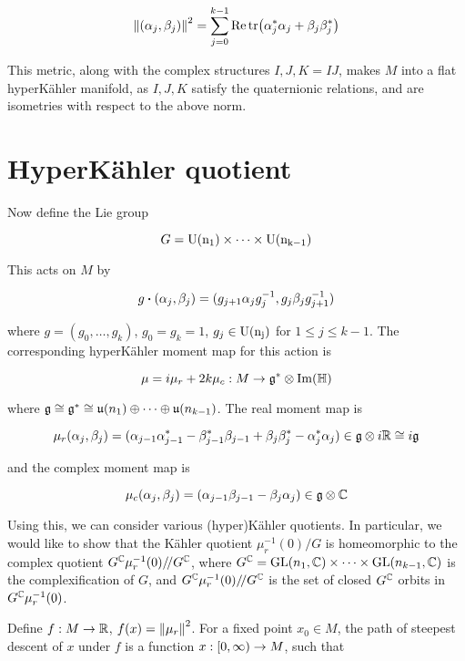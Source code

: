 \documentclass{report}
\newcommand{\sslash}{/\!/}
\begin{document}
\[\norm{(\alpha_j, \beta_j)}^2 = \sum_{j=0}^{k-1}\Re\tr(\alpha_j^*\alpha_j + \beta_j\beta_j^*)\]

This metric, along with the complex structures \(I, J, K = IJ\), makes \(M\) into a flat hyperK\"ahler manifold, as \(I, J, K\) satisfy the quaternionic relations, and are isometries with respect to the above norm.

\section{HyperK\"ahler quotient}

\label{sec:hyperkahler-quotient}

Now define the Lie group

\[G = \rm U(n_1) \times \cdots \times \rm U(n_{k-1})\]

This acts on \(M\) by

\begin{equation}
    \label{eq:ks-action}
    g \vdot (\alpha_j, \beta_j) = (g_{j+1}\alpha_jg_j^{-1}, g_j\beta_jg_{j+1}^{-1})
\end{equation}

where \(g = (g_0, \dots, g_k)\), \(g_0 = g_k = 1\), \(g_j \in \rm U(n_j)\) for \(1 \le j \le k-1\). The corresponding hyperK\"ahler moment map for this action is

\[\mu = i\mu_r + 2k\mu_c : M \to \mathfrak{g}^* \otimes \Im(\mathbb{H})\]

where \(\mathfrak{g} \cong \mathfrak{g}^* \cong \mathfrak{u}(n_1) \oplus \cdots \oplus \mathfrak{u}(n_{k-1})\). The real moment map is

\[\mu_r(\alpha_j, \beta_j) = (\alpha_{j-1}\alpha_{j-1}^* - \beta_{j-1}^*\beta_{j-1} + \beta_j\beta_j^* - \alpha_j^*\alpha_j) \in \mathfrak{g} \otimes i\mathbb{R} \cong i\mathfrak{g}\]

and the complex moment map is

\[\mu_c(\alpha_j, \beta_j) = (\alpha_{j-1}\beta_{j-1} - \beta_j\alpha_j) \in \mathfrak{g} \otimes \mathbb{C}\]

Using this, we can consider various (hyper)K\"ahler quotients. In particular, we would like to show that the K\"ahler quotient \(\mu_r^{-1}(0)/G\) is homeomorphic to the complex quotient \(G^\C\mu_r^{-1}(0)\sslash G^\C\), where \(G^{\mathbb{C}} = \operatorname{GL}(n_1, \mathbb{C}) \times \cdots \times \operatorname{GL}(n_{k-1}, \mathbb{C})\) is the complexification of \(G\), and \(G^\C\mu_r^{-1}(0)\sslash G^\C\) is the set of closed \(G^{\mathbb{C}}\) orbits in \(G^{\mathbb{C}}\mu_r^{-1}(0)\).

Define \(f : M \to \mathbb{R}\), \(f(x) = \norm{\mu_r}^2\). For a fixed point \(x_0 \in M\), the path of steepest descent of \(x\) under \(f\) is a function \(x : [0, \infty) \to M\), such that
\end{document}
